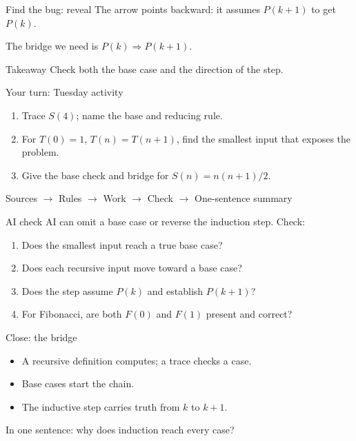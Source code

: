 \documentclass[aspectratio=169,10pt]{beamer}
\begin{document}
\begin{frame}{Find the bug: reveal}
  The arrow points backward: it assumes $P(k+1)$ to get $P(k)$.

  \vfill The bridge we need is $P(k)\Rightarrow P(k+1)$.

  \begin{block}{Takeaway}
    Check both the base case and the direction of the step.
  \end{block}
\end{frame}

\begin{frame}{Your turn: Tuesday activity}
  \begin{enumerate}
    \item Trace $S(4)$; name the base and reducing rule.
    \item For $T(0)=1$, $T(n)=T(n+1)$, find the smallest input that exposes the problem.
    \item Give the base check and bridge for $S(n)=n(n+1)/2$.
  \end{enumerate}
  \vfill\centering Sources $\to$ Rules $\to$ Work $\to$ Check $\to$ One-sentence summary
\end{frame}

\begin{frame}{AI check}
  AI can omit a base case or reverse the induction step. Check:
  \begin{enumerate}
    \item Does the smallest input reach a true base case?
    \item Does each recursive input move toward a base case?
    \item Does the step assume $P(k)$ and establish $P(k+1)$?
    \item For Fibonacci, are both $F(0)$ and $F(1)$ present and correct?
  \end{enumerate}
\end{frame}

\begin{frame}{Close: the bridge}
  \begin{itemize}
    \item A recursive definition computes; a trace checks a case.
    \item Base cases start the chain.
    \item The inductive step carries truth from $k$ to $k+1$.
  \end{itemize}
  \vfill\centering\Large In one sentence: why does induction reach every case?
\end{frame}
\end{document}
